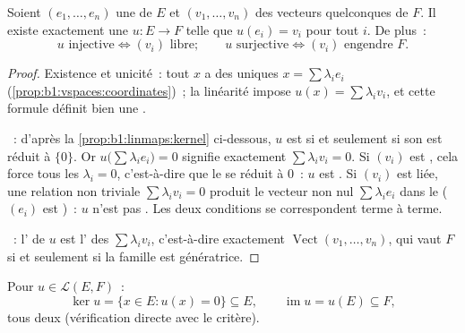 \begin{proposition}\label{prop:b1:linmaps:basis}
Soient $(e_1, \dots, e_n)$ une  de $E$ et $(v_1, \dots, v_n)$
des vecteurs quelconques de $F$. Il existe exactement une  $u \colon E \to F$ telle que $u(e_i) = v_i$ pour tout $i$. De
plus~:
\[
u \text{ injective} \iff (v_i) \text{ libre};
\qquad
u \text{ surjective} \iff (v_i) \text{ engendre } F .
\]
\end{proposition}

\begin{proof}
Existence et unicité~: tout $x$ a des  uniques $x = \sum
\lambda_i e_i$ (\cref{prop:b1:vspaces:coordinates})~; la linéarité
impose $u(x) = \sum \lambda_i v_i$, et cette formule définit bien une
.

~: d'après la \cref{prop:b1:linmaps:kernel} ci-dessous, $u$ est
 si et seulement si son  est réduit à $\{0\}$. Or $u\bigl(\sum\lambda_i
e_i\bigr) = 0$ signifie exactement $\sum\lambda_i v_i = 0$. Si $(v_i)$
est , cela force tous les $\lambda_i = 0$, c'est-à-dire que le 
se réduit à $0$~: $u$ est . Si $(v_i)$ est liée, une relation
non triviale $\sum\lambda_i v_i = 0$ produit le vecteur non nul
$\sum\lambda_i e_i$ dans le  ($(e_i)$ est )~: $u$ n'est pas
. Les deux conditions se correspondent terme à terme.

~: l' de $u$ est l' des $\sum\lambda_i
v_i$, c'est-à-dire exactement $\operatorname{Vect}(v_1, \dots, v_n)$, qui
vaut $F$ si et seulement si la famille est génératrice.
\end{proof}

\begin{definition}\label{def:b1:linmaps:kerim}
Pour $u \in \mathcal{L}(E, F)$~:
\[
\ker u = \{x \in E : u(x) = 0\} \subseteq E,
\qquad
\operatorname{im} u = u(E) \subseteq F ,
\]
tous deux  (vérification directe avec le
critère).
\end{definition}


